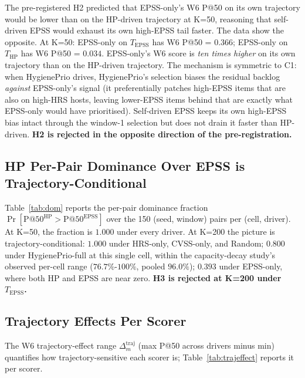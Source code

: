 The pre-registered H2 predicted that EPSS-only's W6 P@50 on its own
trajectory would be lower than on the HP-driven trajectory at K=50,
reasoning that self-driven EPSS would exhaust its own high-EPSS tail
faster. The data show the opposite. At K=50:
EPSS-only on $T_{\mathrm{EPSS}}$ has W6 P@50 = $0.366$;
EPSS-only on $T_{\mathrm{HP}}$ has W6 P@50 = $0.034$.
EPSS-only's W6 score is \textit{ten times higher} on its own trajectory
than on the HP-driven trajectory. The mechanism is symmetric to C1:
when HygienePrio drives, HygienePrio's selection biases the residual
backlog \textit{against} EPSS-only's signal (it preferentially patches
high-EPSS items that are also on high-HRS hosts, leaving lower-EPSS
items behind that are exactly what EPSS-only would have prioritised).
Self-driven EPSS keeps its own high-EPSS bias intact through the
window-1 selection but does not drain it faster than HP-driven.
\textbf{H2 is rejected in the opposite direction of the pre-registration.}

\subsection{HP Per-Pair Dominance Over EPSS is Trajectory-Conditional}



Table~\ref{tab:dom} reports the per-pair dominance fraction
$\Pr[\mathrm{P@50}^{\mathrm{HP}} > \mathrm{P@50}^{\mathrm{EPSS}}]$ over
the 150 (seed, window) pairs per (cell, driver). At K=50, the fraction
is $1.000$ under every driver. At K=200 the picture is
trajectory-conditional: $1.000$ under HRS-only, CVSS-only, and Random;
$0.800$ under HygienePrio-full at this single cell, within the capacity-decay study's
observed per-cell range ($76.7\%$-$100\%$, pooled $96.0\%$);
$0.393$ under EPSS-only, where both HP and EPSS are near zero.
\textbf{H3 is rejected at K=200 under $T_{\mathrm{EPSS}}$.}

\subsection{Trajectory Effects Per Scorer}

The W6 trajectory-effect range $\Delta^{\mathrm{traj}}_m$
(max P@50 across drivers minus min) quantifies how trajectory-sensitive
each scorer is; Table~\ref{tab:trajeffect} reports it per scorer.

